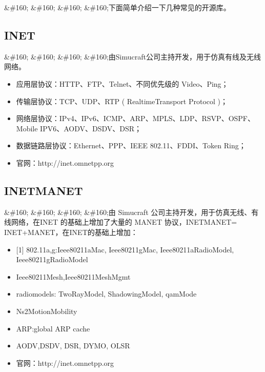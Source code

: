 \&\#160; \&\#160; \&\#160; \&\#160;下面简单介绍一下几种常见的开源库。

\subsection{INET}
\label{inet}

\&\#160; \&\#160; \&\#160; \&\#160;由Simucraft公司主持开发，用于仿真有线及无线网络。

\begin{itemize}
\item 应用层协议：HTTP、FTP、Telnet、不同优先级的 Video、Ping；

\item 传输层协议：TCP、UDP、RTP ( RealtimeTransport Protocol )；

\item 网络层协议：IPv4、IPv6、ICMP、ARP、MPLS、LDP、RSVP、OSPF、Mobile IPV6、AODV、DSDV、DSR；

\item 数据链路层协议：Ethernet、PPP、IEEE 802.11、FDDI、Token Ring；

\item 官网：http:\slash \slash inet.omnetpp.org

\end{itemize}

\subsection{INETMANET}
\label{inetmanet}

\&\#160; \&\#160; \&\#160; \&\#160;由 Simucraft 公司主持开发，用于仿真无线、有线网络，在INET 的基础上增加了大量的 MANET 协议，INETMANET= INET+MANET，在INET的基础上增加：

\begin{itemize}
\item {[1]} 802.11a,g:Ieee80211aMac, Ieee80211gMac, Ieee80211aRadioModel, Ieee80211gRadioModel

\item Ieee80211Mesh,Ieee80211MeshMgmt

\item radiomodels: TwoRayModel, ShadowingModel, qamMode

\item Ns2MotionMobility

\item ARP:global ARP cache

\item AODV,DSDV, DSR, DYMO, OLSR

\item 官网：http:\slash \slash inet.omnetpp.org

\end{itemize}

